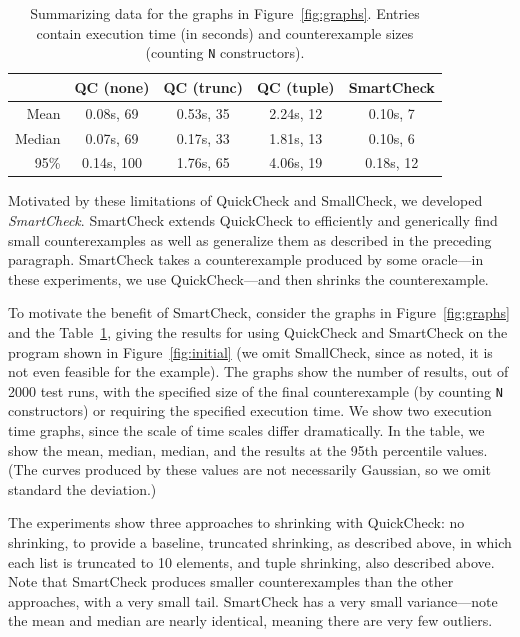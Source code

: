 \documentclass{sigplanconf}
\newcommand{\ttp}[1]{\texttt{#1}}
\begin{document}
\begin{table}[ht]
\footnotesize
  \begin{center}
    \begin{tabular}{|r||c|c|c|c|}
\hline
           & QC (none)  & QC (trunc) & QC (tuple) & SmartCheck\\
\hline \hline
Mean       & 0.08s, 69  & 0.53s, 35  & 2.24s, 12  & 0.10s, 7\\
\hline
Median     & 0.07s, 69  & 0.17s, 33  & 1.81s, 13  & 0.10s, 6\\
\hline
95\%       & 0.14s, 100 & 1.76s, 65  & 4.06s, 19  & 0.18s, 12\\
\hline
    \end{tabular}
  \end{center}
  \caption{Summarizing data for the graphs in Figure~\ref{fig:graphs}. Entries
    contain execution time (in seconds) and counterexample sizes (counting
    \ttp{N} constructors).}
  \label{table:results}
\end{table}

Motivated by these limitations of QuickCheck and SmallCheck, we developed
\emph{SmartCheck}.  SmartCheck extends QuickCheck to efficiently and generically
find small counterexamples as well as generalize them as described in the
preceding paragraph.  SmartCheck takes a counterexample produced by some
oracle---in these experiments, we use QuickCheck---and then shrinks the
counterexample.

To motivate the benefit of SmartCheck, consider the graphs in
Figure~\ref{fig:graphs} and the Table~\ref{table:results}, giving the results
for using QuickCheck and SmartCheck on the program shown in
Figure~\ref{fig:initial} (we omit SmallCheck, since as noted, it is not even
feasible for the example).  The graphs show the number of results, out of 2000
test runs, with the specified size of the final counterexample (by counting
\ttp{N} constructors) or requiring the specified execution time.  We show two
execution time graphs, since the scale of time scales differ dramatically.  In
the table, we show the mean, median, median, and the results at the 95th
percentile values.  (The curves produced by these values are not necessarily
Gaussian, so we omit standard the deviation.)

The experiments show three approaches to shrinking with QuickCheck: no
shrinking, to provide a baseline, truncated shrinking, as described above, in
which each list is truncated to 10 elements, and tuple shrinking, also described
above.  Note that SmartCheck produces smaller counterexamples than the other
approaches, with a very small tail.  SmartCheck has a very small variance---note
the mean and median are nearly identical, meaning there are very few outliers.
\end{document}
